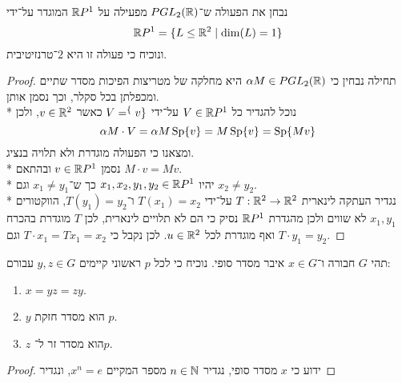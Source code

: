 \Subquestion{}
נבחן את הפעולה ש־$PGL_2(\mathbb{R})$ מפעילה על $\mathbb{R} P^1$ המוגדר על־ידי
\[
	\mathbb{R} P^1 = \{ L \le \mathbb{R}^2 \mid \dim(L) = 1 \}
\]
ונוכיח כי פעולה זו היא $2$־טרנזיטיבית.
\begin{proof}
	תחילה נבחין כי $\alpha M \in PGL_2(\mathbb{R})$ היא מחלקה של מטריצות הפיכות מסדר שתיים ומכפלתן בכל סקלר, וכך נסמן אותן. \\*
	נוכל להגדיר כל $V \in \mathbb{R} P^1$ על־ידי $V = \sp\{ v\}$ כאשר $v \in \mathbb{R}^2$, ולכן
	\[
		\alpha M \cdot V = \alpha M \operatorname{Sp}\{ v \} = M \operatorname{Sp}\{ v \} = \operatorname{Sp}\{ Mv \}
	\]
	ומצאנו כי הפעולה מוגדרת ולא תלויה בנציג. \\*
	נסמן $v \in \mathbb{R} P^1$ ובהתאם $M \cdot v = Mv$. \\*
	יהיו $x_1, x_2, y_1, y_2 \in \mathbb{R} P^1$ כך ש־$x_1 \ne y_1$ וגם $x_2 \ne y_2$. \\*
	נגדיר העתקה לינארית $T : \mathbb{R}^2 \to \mathbb{R}^2$ על־ידי $T(x_1) = x_2$ ו־$T(y_1) = y_2$, הווקטורים $x_1, y_1$ לא שווים ולכן מהגדרת $\mathbb{R} P^1$ נסיק כי הם לא תלויים לינארית, לכן $T$ מוגדרת בהכרח ואף מוגדרת לכל $u \in \mathbb{R}^2$.
	לכן נקבל כי $T \cdot x_1 = T x_1 = x_2$ וגם $T \cdot y_1 = y_2$.
\end{proof}

\Question{}
תהי $G$ חבורה ו־$x \in G$ איבר מסדר סופי.
נוכיח כי לכל $p$ ראשוני קיימים $y, z \in G$ עבורם:
\begin{enumerate}
	\item $x = yz = zy$.
	\item $y$ הוא מסדר חזקת $p$.
	\item $z$ הוא מסדר זר ל־$p$.
\end{enumerate}
\begin{proof}
	ידוע כי $x$ מסדר סופי, נגדיר $n \in \mathbb{N}$ מספר המקיים $x^n = e$, ונגדיר
\end{proof}


